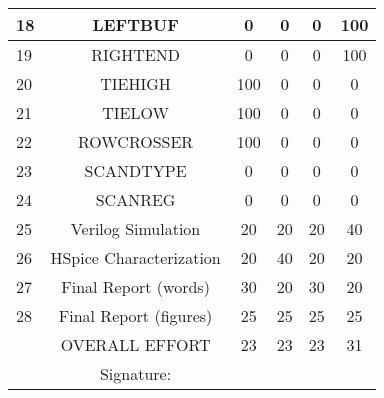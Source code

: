 \begin{table}[htb!]
\begin{tabular}{|p{1cm}|c|c|c|c|c|}
18&LEFTBUF					&	0	&	0	&	0	&	100	\\ \hline
19&RIGHTEND					&	0	&	0	&	0	&	100	\\ \hline
20&TIEHIGH					&	100	&	0	&	0	&	0	\\ \hline
21&TIELOW						&	100	&	0	&	0	&	0	\\ \hline
22&ROWCROSSER				&	100	&	0	&	0	&	0	\\ \hline
23&SCANDTYPE				&	0	&	0	&	0	&	0	\\ \hline
24&SCANREG					&	0	&	0	&	0	&	0	\\ \hline
25&Verilog Simulation				&	20	&	20	&	20	&	40	\\ \hline
26&HSpice Characterization	&	20	&	40	&	20	&	20	\\ \hline
27& Final Report (words)		&	30	&	20	&	30	&	20	\\ \hline
28& Final Report (figures)	&	25	&	25	&	25	&	25	\\ \hline
& OVERALL EFFORT 						&	23	&	23	&	23	&	31	\\ \hline
& Signature: 								& 		& 		& 		&		\\ \hline
\end{tabular}
\end{table}